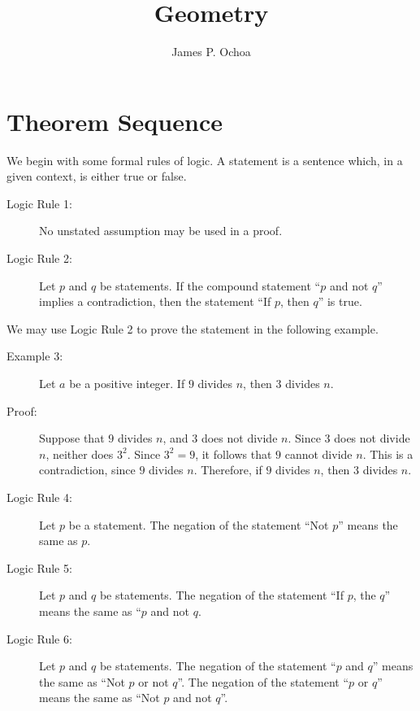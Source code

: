 \documentclass{article}
\let\titlepageAuthor\author
\renewcommand{\author}[1]{\newcommand{\headerAuthor}{#1}\titlepageAuthor{#1}}
\let\titlepageTitle\title
\renewcommand{\title}[1]{\newcommand{\headerTitle}{#1}\titlepageTitle{#1}}
\begin{document}
\title{Geometry}
\author{James P. Ochoa}
\date{ }
\maketitle
\thispagestyle{empty}



\newpage

\section*{Theorem Sequence}


We begin with some formal rules of logic. A statement is a sentence which, in a given context, is either true or false.

\begin{description}

\item[Logic Rule 1:] No unstated assumption may be used in a proof.

\item[Logic Rule 2:] Let $p$ and $q$ be statements. If the compound statement ``$p$ and not $q$'' implies a contradiction, then the statement ``If $p$, then $q$'' is true.

\end{description}

We may use Logic Rule 2 to prove the statement in the following example.

\begin{description}

\item[Example 3:] Let $a$ be a positive integer. If $9$ divides $n$, then $3$ divides $n$.

\item[Proof:] Suppose that $9$ divides $n$, and $3$ does not divide $n$. Since $3$ does not divide $n$, neither does $3^{2}$. Since $3^{2}=9$, it follows that $9$ cannot divide $n$. This is a contradiction, since $9$ divides $n$. Therefore, if $9$ divides $n$, then $3$ divides $n$.

\item[Logic Rule 4:] Let $p$ be a statement. The negation of the statement ``Not $p$'' means the same as $p$.

\item[Logic Rule 5:] Let $p$ and $q$ be statements. The negation of the statement ``If $p$, the $q$'' means the same as ``$p$ and not $q$.

\item[Logic Rule 6:] Let $p$ and $q$ be statements. The negation of the statement ``$p$ and $q$'' means the same as ``Not $p$ or not $q$''. The negation of the statement ``$p$ or $q$'' means the same as ``Not $p$ and not $q$''.

\end{description}
\end{document}
